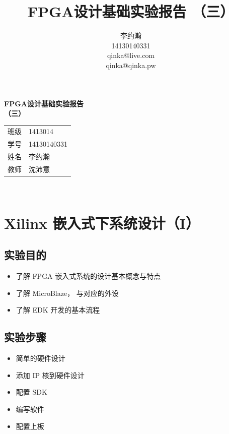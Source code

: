 \documentclass{ctexart}
\author{李约瀚 \\ 14130140331 \\ qinka@live.com \\ qinka@qinka.pw}
\title{FPGA设计基础实验报告 （三）}
\begin{document}
    
        \thispagestyle{empty}
        \begin{center}
            \vspace*{4em}
            {\Huge\textbf{FPGA设计基础实验报告\\\vspace*{0.5em} （三）}}
            \vfill
            \large
            \begin{tabular}{c@{：}l}
                班级 & 1413014 \\
                学号 & 14130140331 \\ 
                姓名 & 李约瀚 \\ 
                教师 & 沈沛意 \\
            \end{tabular} 
            \vspace*{4em}\\
        \end{center}
        \newpage
        
       
        \setcounter{page}{0}
        \setcounter{section}{0}


        \section{Xilinx 嵌入式下系统设计（I）}
        
        \subsection{实验目的}
        \begin{itemize}
            \item 了解 FPGA 嵌入式系统的设计基本概念与特点
            \item 了解 MicroBlaze， 与对应的外设
            \item 了解 EDK 开发的基本流程
        \end{itemize}
        
        \subsection{实验步骤}
        
        \begin{itemize}
            \item 简单的硬件设计
            \item 添加 IP 核到硬件设计
            \item 配置 SDK
            \item 编写软件
            \item 配置上板
        \end{itemize}
\end{document}
